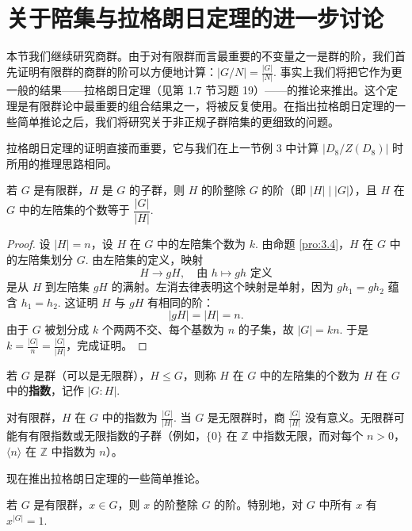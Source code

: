 \section{关于陪集与拉格朗日定理的进一步讨论}

本节我们继续研究商群。由于对有限群而言最重要的不变量之一是群的阶，我们首先证明有限群的商群的阶可以方便地计算：\(|G/N| = \frac{|G|}{|N|}\). 事实上我们将把它作为更一般的结果——拉格朗日定理（见第 1.7 节习题 19）——的推论来推出。这个定理是有限群论中最重要的组合结果之一，将被反复使用。在指出拉格朗日定理的一些简单推论之后，我们将研究关于非正规子群陪集的更细致的问题。

拉格朗日定理的证明直接而重要，它与我们在上一节例 3 中计算 \(|D_8/Z(D_8)|\) 时所用的推理思路相同。

\begin{theorem}[拉格朗日定理]\label{thm:3.8}
若 \(G\) 是有限群，\(H\) 是 \(G\) 的子群，则 \(H\) 的阶整除 \(G\) 的阶（即 \(|H| \mid |G|\)），且 \(H\) 在 \(G\) 中的左陪集的个数等于 \(\dfrac{|G|}{|H|}\).
\end{theorem}

\begin{proof}
设 \(|H| = n\)，设 \(H\) 在 \(G\) 中的左陪集个数为 \(k\). 由命题 \ref{pro:3.4}，\(H\) 在 \(G\) 中的左陪集划分 \(G\). 由左陪集的定义，映射
\[
H \to gH, \quad \text{由 } h \mapsto gh \text{ 定义}
\]
是从 \(H\) 到左陪集 \(gH\) 的满射。左消去律表明这个映射是单射，因为 \(gh_1 = gh_2\) 蕴含 \(h_1 = h_2\). 这证明 \(H\) 与 \(gH\) 有相同的阶：
\[
|gH| = |H| = n.
\]
由于 \(G\) 被划分成 \(k\) 个两两不交、每个基数为 \(n\) 的子集，故 \(|G| = kn\). 于是 \(k = \frac{|G|}{n} = \frac{|G|}{|H|}\)，完成证明。
\end{proof}

\begin{definition}
若 \(G\) 是群（可以是无限群），\(H \leq G\)，则称 \(H\) 在 \(G\) 中的左陪集的个数为 \(H\) 在 \(G\) 中的\textbf{指数}，记作 \(|G : H|\).
\end{definition}

对有限群，\(H\) 在 \(G\) 中的指数为 \(\frac{|G|}{|H|}\). 当 \(G\) 是无限群时，商 \(\frac{|G|}{|H|}\) 没有意义。无限群可能有有限指数或无限指数的子群（例如，\(\{0\}\) 在 \(\mathbb{Z}\) 中指数无限，而对每个 \(n > 0\)，\(\langle n \rangle\) 在 \(\mathbb{Z}\) 中指数为 \(n\)）。

现在推出拉格朗日定理的一些简单推论。

\begin{corollary}\label{cor:3.9}
若 \(G\) 是有限群，\(x \in G\)，则 \(x\) 的阶整除 \(G\) 的阶。特别地，对 \(G\) 中所有 \(x\) 有 \(x^{|G|} = 1\).
\end{corollary}

